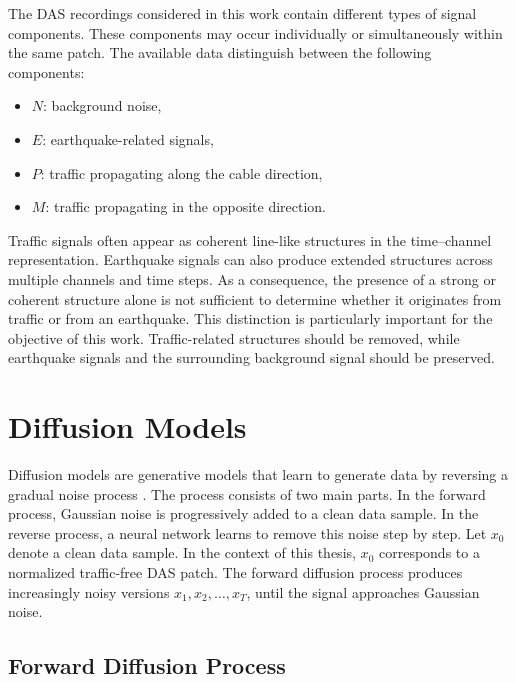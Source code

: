 \documentclass[english,ba]{tudo-sse-thesis}
\begin{document}
The DAS recordings considered in this work contain different types of
signal components. These components may occur individually or
simultaneously within the same patch.
The available data distinguish between the following components:
\begin{itemize}
    \item \(N\): background noise,
    \item \(E\): earthquake-related signals,
    \item \(P\): traffic propagating along the cable direction,
    \item \(M\): traffic propagating in the opposite direction.
\end{itemize}
Traffic signals often appear as coherent line-like structures in the
time--channel representation. Earthquake signals can also produce
extended structures across multiple channels and time steps. As a
consequence, the presence of a strong or coherent structure alone is not
sufficient to determine whether it originates from traffic or from an
earthquake.
This distinction is particularly important for the objective of this
work. Traffic-related structures should be removed, while earthquake
signals and the surrounding background signal should be preserved.

\section{Diffusion Models}

Diffusion models are generative models that learn to generate data by
reversing a gradual noise process \cite{ho2020ddpm}. The process consists
of two main parts. In the forward process, Gaussian noise is progressively
added to a clean data sample. In the reverse process, a neural network
learns to remove this noise step by step.
Let \(x_0\) denote a clean data sample. In the context of this thesis,
\(x_0\) corresponds to a normalized traffic-free DAS patch. The forward
diffusion process produces increasingly noisy versions
\(x_1, x_2, \ldots, x_T\), until the signal approaches Gaussian noise.

\subsection{Forward Diffusion Process}
\end{document}
